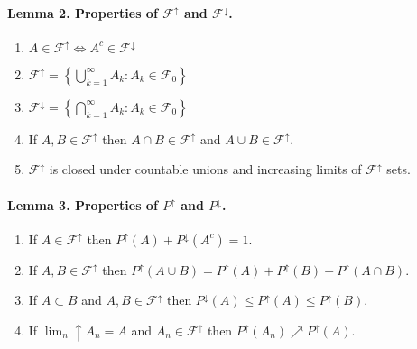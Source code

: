 \documentclass[10pt,letterpaper]{article}
\begin{document}
\paragraph{Lemma 2. Properties of $\mathcal F^\uparrow$ and $\mathcal F^\downarrow$.}
\begin{enumerate}
\item  $A\in \mathcal F^\uparrow \Leftrightarrow A^c \in \mathcal F^\downarrow$
\item $\mathcal F^{\uparrow}= \left\{ \bigcup_{k=1}^\infty A_k \colon A_k\in \mathcal F_0 \right\}$
\item $\mathcal F^{\downarrow}= \left\{ \bigcap_{k=1}^\infty A_k \colon A_k\in \mathcal F_0 \right\}$ 
\item If $A, B\in \mathcal F^{\uparrow}$ then $A\cap B\in \mathcal  F^{\uparrow}$ and $A\cup B\in \mathcal  F^{\uparrow}$.
\item $\mathcal F^{\uparrow}$ is closed under countable unions and increasing limits of $\mathcal F^\uparrow$ sets.
\end{enumerate}


\paragraph{Lemma 3. Properties of $P^\uparrow$ and $P^\downarrow$.}
\begin{enumerate}
\item If $A\in \mathcal F^{\uparrow}$ then $P^\uparrow (A) + P^\downarrow(A^c) = 1$.
\item  If $A, B\in \mathcal F^\uparrow$ then $P^\uparrow(A\cup B)= P^\uparrow(A) + P^\uparrow(B) - P^\uparrow(A\cap B)$.
\item If $A\subset B$ and $A, B\in \mathcal F^\uparrow$ then $P^\downarrow (A)\leq P^\uparrow (A)\leq P^\uparrow(B)$. 
\item If $\lim_n\!\!\uparrow A_n= A$ and $A_n\in \mathcal F^\uparrow$ then $P^\uparrow(A_n)\nearrow P^\uparrow(A)$.
\end{enumerate}


\end{document}
